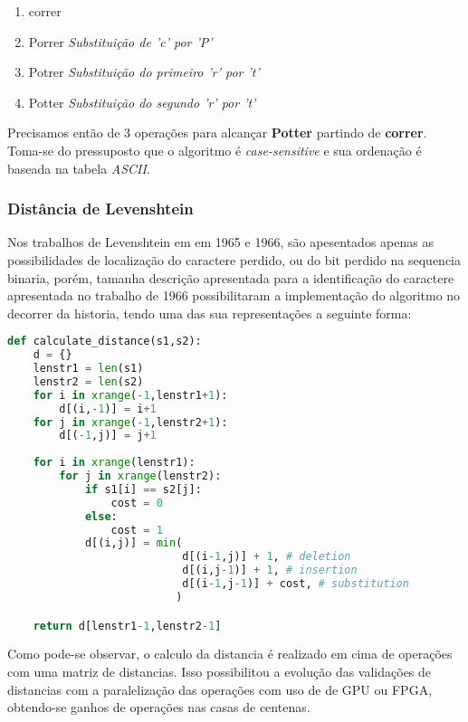 \begin{enumerate}[start=0]
	\item correr
	\item Porrer \textit{Substituição de 'c' por 'P'}
	\item Potrer \textit{Substituição do primeiro 'r' por 't'}
	\item Potter \textit{Substituição do segundo 'r' por 't'}
\end{enumerate}

Precisamos então de 3 operações para alcançar \textbf{Potter} partindo de \textbf{correr}. Toma-se do pressuposto que o algoritmo é \textit{case-sensitive} e sua ordenação é baseada na tabela \textit{ASCII}.

\subsubsection{Distância de Levenshtein}
\label{sub:algoritmo_da_distancia}

Nos trabalhos de Levenshtein em em 1965 e 1966, são apesentados apenas as possibilidades de localização do caractere perdido, ou do bit perdido na sequencia binaria, porém, tamanha descrição apresentada para a identificação do caractere apresentada no trabalho de 1966\cite{levenshtein1966} possibilitaram a implementação do algoritmo no decorrer da historia, tendo uma das sua representações a seguinte forma:

\begin{lstlisting}[language=Python,label=damerau_levenshtein_distance_py,caption={Implementação da distância de Levenshtein}]
def calculate_distance(s1,s2):
    d = {}
    lenstr1 = len(s1)
    lenstr2 = len(s2)
    for i in xrange(-1,lenstr1+1):
        d[(i,-1)] = i+1
    for j in xrange(-1,lenstr2+1):
        d[(-1,j)] = j+1
 
    for i in xrange(lenstr1):
        for j in xrange(lenstr2):
            if s1[i] == s2[j]:
                cost = 0
            else:
                cost = 1
            d[(i,j)] = min(
                           d[(i-1,j)] + 1, # deletion
                           d[(i,j-1)] + 1, # insertion
                           d[(i-1,j-1)] + cost, # substitution
                          )

    return d[lenstr1-1,lenstr2-1]
\end{lstlisting}

Como pode-se observar,  o calculo da distancia é realizado em cima de operações com uma matriz de distancias. Isso possibilitou a evolução das validações de distancias com a paralelização das operações com uso de de GPU ou FPGA, obtendo-se ganhos de operações nas casas de centenas.
